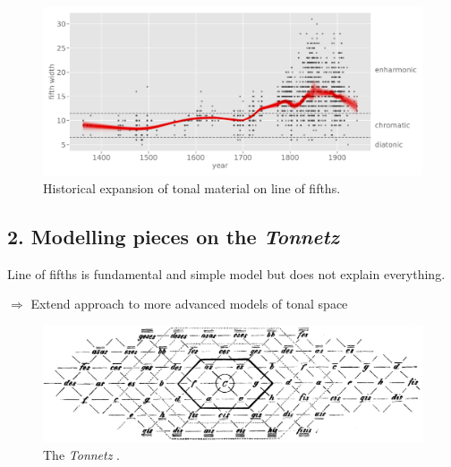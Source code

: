 \begin{frame}{\insertsectionhead}
  \begin{figure}
    \centering
    \includegraphics[width=\textwidth]{img/fifth_width.pdf}
    \caption{Historical expansion of tonal material on line of fifths.}
    \label{}
  \end{figure}
\end{frame}


\subsection{2. Modelling pieces on the \emph{Tonnetz}}

\begin{frame}{\insertsectionhead}

  Line of fifths is fundamental and simple model but does not explain everything.
  \pause

  $\Rightarrow$ Extend approach to more advanced \alert{models of tonal space}

  \pause

  \begin{figure}
    \centering
    \includegraphics[width=.75\textwidth]{img/hostinsky_tonnetz.png}
    \caption{The \emph{Tonnetz} \citep{Hostinsky1879}.}
    \label{}
  \end{figure}

\end{frame}

